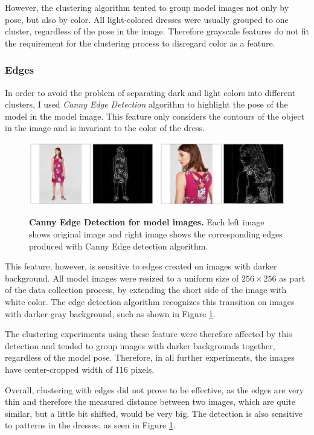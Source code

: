 \documentclass[12pt]{report}
\begin{document}
However, the clustering algorithm tented to group model images not only by pose, but also by color. All light-colored dresses were usually grouped to one cluster, regardless of the pose in the image. Therefore grayscale features do not fit the requirement for the clustering process to disregard color as a feature.


\subsubsection{Edges}
In order to avoid the problem of separating dark and light colors into different clusters, I used \textit{Canny Edge Detection} algorithm to highlight the pose of the model in the model image. This feature only considers the contours of the object in the image and is invariant to the color of the dress.

\begin{figure}[h]
\centering
{\includegraphics[width=\linewidth]{04_experiments/clustering/edges_data}}
\caption{\label{fig:cluster_edges_data} \textbf{Canny Edge Detection for model images.} Each left image shows original image and right image shows the corresponding edges produced with Canny Edge detection algorithm.}
\end{figure}

This feature, however, is sensitive to edges created on images with darker background. All model images were resized to a uniform size of $256\times256$ as part of the data collection process, by extending the short side of the image with white color. The edge detection algorithm recognizes this transition on images with darker gray background, such as shown in Figure \ref{fig:cluster_edges_data}. 

The clustering experiments using these feature were therefore affected by this detection and tended to group images with darker backgrounds together, regardless of the model pose. Therefore, in all further experiments, the images have center-cropped width of 116 pixels.

Overall, clustering with edges did not prove to be effective, as the edges are very thin and therefore the measured distance between two images, which are quite similar, but a little bit shifted, would be very big. The detection is also sensitive to patterns in the dresses, as seen in Figure \ref{fig:cluster_edges_data}.
\end{document}
